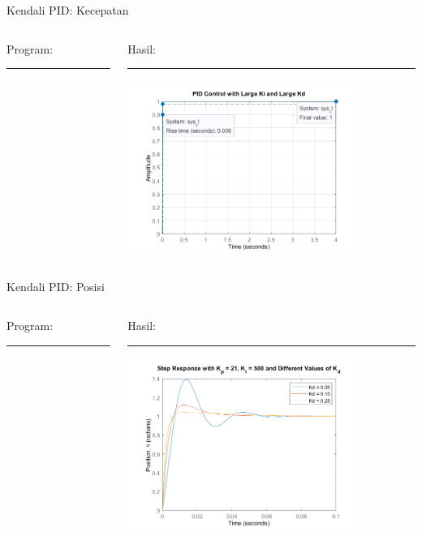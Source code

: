 \documentclass[10pt,xcolor={dvipsnames}]{beamer}
\begin{document}
\begin{frame}{Kendali PID: Kecepatan}
	\begin{columns}[T] %
		\begin{column}{0.48\textwidth}
			Program:
			\color{black}\rule{\linewidth}{4pt}
			
		\end{column}%
		\hfill%
		\begin{column}{0.48\textwidth}
			Hasil:
				\color{blue}\rule{\linewidth}{4pt}
			\begin{center}
				\includegraphics[width=7.5cm]{Matlab/PIDSpeed.png}
			\end{center}
		\end{column}
	\end{columns}
\end{frame}

\begin{frame}{Kendali PID: Posisi}
	\begin{columns}[T] %
		\begin{column}{0.48\textwidth}
			Program:
			\color{black}\rule{\linewidth}{4pt}
			
		\end{column}%
		\hfill%
		\begin{column}{0.48\textwidth}
			Hasil:
			\color{blue}\rule{\linewidth}{4pt}
			\begin{center}
				\includegraphics[width=7.5cm]{Matlab/PIDpos.png}
			\end{center}
		\end{column}
	\end{columns}
\end{frame}
\end{document}
